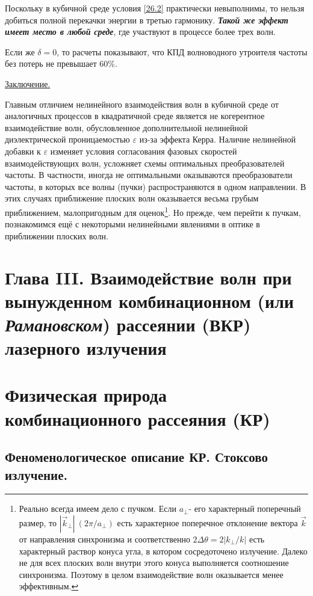 \documentclass[a4paper]{article}
\begin{document}
	Поскольку в кубичной среде условия \eqref{26.2} практически невыполнимы, то нельзя добиться полной перекачки энергии в третью гармонику. \textit{\textbf{Такой же эффект имеет место в любой среде}}, где участвуют в процессе более трех волн.
	
	Если же $\delta=0$, то расчеты показывают, что КПД волноводного утроителя частоты без потерь не превышает $60\%$.

	\underline{Заключение.}
	
	Главным отличием нелинейного взаимодействия волн в кубичной среде от аналогичных процессов в квадратичной среде является не когерентное взаимодействие волн, обусловленное дополнительной нелинейной диэлектрической проницаемостью $\varepsilon$ из-за эффекта Керра. Наличие нелинейной добавки к $\varepsilon$ изменяет условия согласования фазовых скоростей взаимодействующих волн, усложняет схемы оптимальных преобразователей частоты. В частности, иногда не оптимальными оказываются преобразователи частоты, в которых все волны (пучки) распространяются в одном направлении. В этих случаях приближение плоских волн оказывается весьма грубым приближением, малопригодным для оценок\footnote{Реально всегда имеем дело с пучком. Если $a_{\perp}$- его характерный поперечный размер, то $|\vec{k}_{\perp}|~(2\pi/a_{\perp})$ есть характерное поперечное отклонение вектора  $\vec{k}$  от направления синхронизма и соответственно $2\Delta\theta=2|k_{\perp}/k|$ есть характерный раствор конуса угла, в котором сосредоточено излучение. Далеко не для всех плоских волн внутри этого конуса выполняется соотношение синхронизма. Поэтому в целом взаимодействие волн оказывается менее эффективным.}. Но прежде, чем перейти к пучкам, познакомимся ещё с некоторыми нелинейными явлениями в оптике в приближении плоских волн. 
\newpage
\setcounter{section}{0}
\setcounter{equation}{0}
\section*{Глава III. Взаимодействие волн при вынужденном комбинационном (или \textit{Рамановском}) рассеянии (ВКР) лазерного излучения}
\section{Физическая природа комбинационного рассеяния (КР)}
\subsection{Феноменологическое описание КР. Стоксово излучение.}
\end{document}
